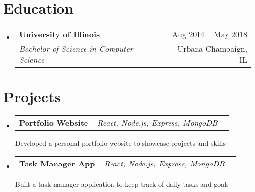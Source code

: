\documentclass[letterpaper,11pt]{article}
\makeatletter
\newcommand{\resumeSubheading}[4]{
  \vspace{0pt}\item
    \begin{tabular*}{0.97\textwidth}[t]{l@{\extracolsep{\fill}}r}
      \textbf{#1} & #2 \vspace{-2pt} \\
      \small\textit{#3} & \small{#4}
    \end{tabular*}\vspace{-7pt}
}
\newcommand{\resumeProjectHeading}[2]{
  \item
  \begin{tabular*}{0.97\textwidth}{l@{\extracolsep{\fill}}r}
    #1 & #2 \\
  \end{tabular*}\vspace{-1pt}
}
\newcommand{\resumeSubHeadingListStart}{\begin{itemize}[leftmargin=0.15in, label={}]}
\newcommand{\resumeSubHeadingListEnd}{\end{itemize}}
\makeatother
\begin{document}
\section{Education}
  \resumeSubHeadingListStart
    \resumeSubheading
      {University of Illinois}{Aug 2014 -- May 2018}
      {Bachelor of Science in Computer Science}{Urbana-Champaign, IL}
  \resumeSubHeadingListEnd

\section{Projects}
  \resumeSubHeadingListStart
    \resumeProjectHeading
      {\textbf{Portfolio Website} ~ \emph{React, Node.js, Express, MongoDB}}{}
    Developed a personal portfolio website to showcase projects and skills\vspace{-4pt}
\resumeProjectHeading
      {\textbf{Task Manager App} ~ \emph{React, Node.js, Express, MongoDB}}{}
    Built a task manager application to keep track of daily tasks and goals\vspace{-4pt}
  \resumeSubHeadingListEnd

\end{document}
